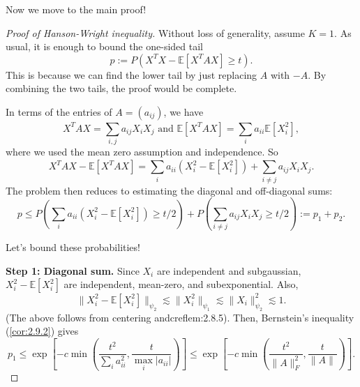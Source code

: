 Now we move to the main proof!
\begin{proof}[Proof of Hanson-Wright inequality]
Without loss of generality, assume $K = 1$. As usual, it is enough to bound the one-sided tail 
\[ p := P(X^TX - \mathbb{E}\left[ X^TAX \right] \geq t). \]
This is because we can find the lower tail by just replacing $A$ with $-A$. By combining the two tails, the 
proof would be complete.

In terms of the entries of $A = (a_{ij})$, we have 
\[ X^TAX = \sum_{i, j}^{}a_{ij}X_iX_j \text{ and } \mathbb{E}\left[ X^TAX \right] = \sum_{i}^{} a_{ii} 
\mathbb{E}\left[ X_i^2 \right], \]
where we used the mean zero assumption and independence. So 
\[ X^TAX - \mathbb{E}\left[ X^TAX \right] = \sum_{i}^{} a_{ii}(X_i^2 - \mathbb{E}\left[ X_i^2 \right]) 
+ \sum_{i \neq j}^{} a_{ij} X_iX_j. \]
The problem then reduces to estimating the diagonal and off-diagonal sums:
\[ p \leq P \left( \sum_{i}^{} a_{ii}(X_i^2 - \mathbb{E}\left[ X_i^2 \right]) \geq t/2 \right) 
+ P \left( \sum_{i \neq j}^{} a_{ij} X_iX_j \geq t/2 \right) := p_1 + p_2. \]

Let's bound these probabilities!

\textbf{Step 1: Diagonal sum.} Since $X_i$ are independent and subgaussian, $X_i^2 - \mathbb{E}\left[ X_i^2 
\right]$ are independent, mean-zero, and subexponential. Also, 
\[ \lVert X_i^2 - \mathbb{E}\left[ X_i^2 \right] \rVert_{\psi_2} \lesssim \lVert X_i^2 \rVert_{\psi_1} 
\lesssim \lVert X_i \rVert_{\psi_2}^2 \lesssim 1. \]
(The above follows from centering andcref{lem:2.8.5}). Then, Bernstein's inequality (\cref{cor:2.9.2}) gives 
\[ p_1 \leq \exp{\left[ -c \min_{}\left( \frac{t^2}{\sum_{i}^{}a_{ii}^2}, \frac{t}{\max_{i}|a_{ii}|} \right) 
\right]} \leq \exp{\left[ -c \min_{}\left( \frac{t^2}{\lVert A \rVert_{F}^2}, \frac{t}{\lVert A \rVert_{}} 
\right) \right]}. \]


\end{proof}

